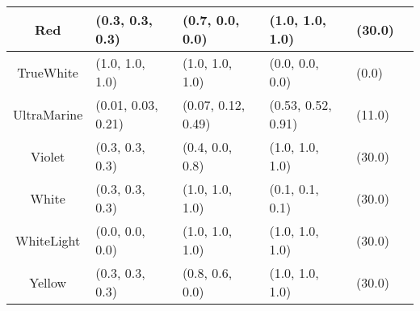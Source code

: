 \begin{table}[H]
\begin{small}
\begin{center}
\begin{tabular}{|c||l|l|l|l|l|}
Red & (0.3, 0.3, 0.3) & (0.7, 0.0, 0.0) & (1.0, 1.0, 1.0) & (30.0) \\ \hline
TrueWhite & (1.0, 1.0, 1.0) & (1.0, 1.0, 1.0) & (0.0, 0.0, 0.0) & (0.0) \\ \hline
UltraMarine & (0.01, 0.03, 0.21) & (0.07, 0.12, 0.49) & (0.53, 0.52, 0.91) & (11.0) \\ \hline
Violet & (0.3, 0.3, 0.3) & (0.4, 0.0, 0.8) & (1.0, 1.0, 1.0) & (30.0) \\ \hline
White & (0.3, 0.3, 0.3) & (1.0, 1.0, 1.0) & (0.1, 0.1, 0.1) & (30.0) \\ \hline
WhiteLight & (0.0, 0.0, 0.0) & (1.0, 1.0, 1.0) & (1.0, 1.0, 1.0) & (30.0) \\ \hline
Yellow & (0.3, 0.3, 0.3) & (0.8, 0.6, 0.0) & (1.0, 1.0, 1.0) & (30.0) \\ \hline
\end{tabular}
\end{center}
\end{small}
\end{table}
